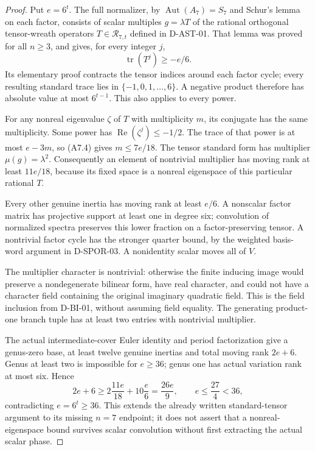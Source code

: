 \begin{proof}
Put $e=6^t$. The full normalizer, by $\operatorname{Aut}(A_7)=S_7$
and Schur's lemma on each factor, consists of scalar multiples
$g=\lambda T$ of the rational orthogonal tensor-wreath operators
$T\in\mathcal R_{7,t}$ defined in D-AST-01. That lemma was proved
for all $n\ge3$, and gives, for every integer $j$,
\[
                 \operatorname{tr}(T^j)\ge-e/6.
                                                               \tag{A7.4}
\]
Its elementary proof contracts the tensor indices around each
factor cycle; every resulting standard trace lies in
$\{-1,0,1,\ldots,6\}$. A negative product therefore has absolute
value at most $6^{t-1}$. This also applies to every power.

For any nonreal eigenvalue $\zeta$ of $T$ with multiplicity $m$,
its conjugate has the same multiplicity. Some power has
$\operatorname{Re}(\zeta^j)\le-1/2$. The trace of that power is
at most $e-3m$, so (A7.4) gives $m\le7e/18$.
The tensor standard form has multiplier $\mu(g)=\lambda^2$.
Consequently an element of nontrivial multiplier has moving rank
at least $11e/18$, because its fixed space is a nonreal eigenspace
of this particular rational $T$.

Every other genuine inertia has moving rank at least $e/6$.
A nonscalar factor matrix has projective support at least one
in degree six; convolution of normalized spectra preserves this
lower fraction on a factor-preserving tensor. A nontrivial factor
cycle has the stronger quarter bound, by the weighted basis-word
argument in D-SPOR-03. A nonidentity scalar moves all of $V$.

The multiplier character is nontrivial: otherwise the finite
inducing image would preserve a nondegenerate bilinear form,
have real character, and could not have a character field
containing the original imaginary quadratic field. This is the
field inclusion from D-BI-01, without assuming field equality.
The generating product-one branch tuple has at least two entries
with nontrivial multiplier.

The actual intermediate-cover Euler identity and period
factorization give a genus-zero base, at least twelve genuine
inertias and total moving rank $2e+6$. Genus at least two is
impossible for $e\ge36$; genus one has actual variation rank at
most six. Hence
\[
        2e+6\ge2\frac{11e}{18}+10\frac e6
                  =\frac{26e}{9},
                \qquad e\le\frac{27}{4}<36,             \tag{A7.5}
\]
contradicting $e=6^t\ge36$. This extends the already written
standard-tensor argument to its missing $n=7$ endpoint; it does
not assert that a nonreal-eigenspace bound survives scalar
convolution without first extracting the actual scalar phase.
\end{proof}

